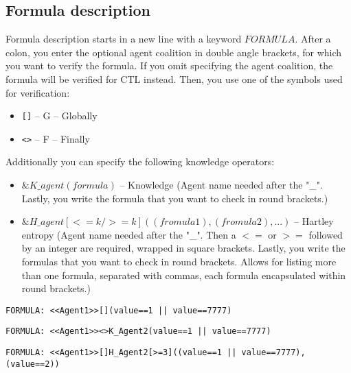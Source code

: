 \documentclass[12pt]{article}
\begin{document}
\subsection{Formula description}
Formula description starts in a new line with a keyword $FORMULA$. After a colon, you enter the optional agent coalition in double angle brackets, for which you want to verify the formula. If you omit specifying the agent coalition, the formula will be verified for CTL instead. Then, you use one of the symbols used for verification:
\begin{itemize}
  \item \verb+[]+ -- G -- Globally
  \item \verb+<>+ -- F -- Finally
\end{itemize}
Additionally you can specify the following knowledge operators:
\begin{itemize}
  \item $\&K{\_}agent(formula)$ -- Knowledge (Agent name needed after the "{\_}". Lastly, you write the formula that you want to check in round brackets.)
  \item $\&H{\_}agent[<=k/>=k]((fromula1), (fromula2), ...)$ -- Hartley entropy (Agent name needed after the "{\_}". Then a $<=$ or $>=$ followed by an integer are required, wrapped in square brackets. Lastly, you write the formulas that you want to check in round brackets. Allows for listing more than one formula, separated with commas, each formula encapsulated within round brackets.)
\end{itemize}
\begin{lstlisting}[title={A formula that checks if there is a strategy that globally Agent1 could take such actions that the value will be always equal to 1 or 7777.}]
  FORMULA: <<Agent1>>[](value==1 || value==7777)
\end{lstlisting}
\begin{lstlisting}[title={A formula that uses a knowledge operator.}]
  FORMULA: <<Agent1>><>K_Agent2(value==1 || value==7777)
\end{lstlisting}
\begin{lstlisting}[title={A formula that uses a Hartley operator.}]
  FORMULA: <<Agent1>>[]H_Agent2[>=3]((value==1 || value==7777),(value==2))
\end{lstlisting}
\end{document}
